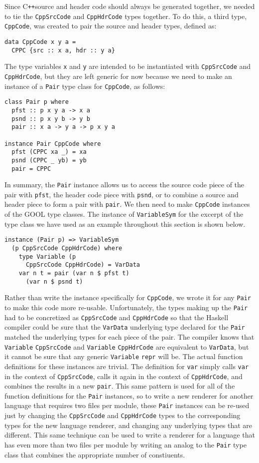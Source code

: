 \documentclass[sigplan,review,anonymous,prologue,dvipsnames]{acmart}
\newcommand{\Cplusplus}{C\texttt{++}}
\begin{document}
Since \Cplusplus source and header code should always be generated together, we needed
to tie the \verb|CppSrcCode| and \verb|CppHdrCode| types together. To do this,
a third type, \verb|CppCode|, was created to pair the source and header types,
defined as:
\begin{lstlisting}
data CppCode x y a =
  CPPC {src :: x a, hdr :: y a}
\end{lstlisting}
The type variables \verb|x| and \verb|y| are intended to be instantiated with
\verb|CppSrcCode| and \verb|CppHdrCode|, but they are left generic for now
because we need to make an instance of a \verb|Pair| type class for
\verb|CppCode|, as follows:
\begin{lstlisting}
class Pair p where
  pfst :: p x y a -> x a
  psnd :: p x y b -> y b
  pair :: x a -> y a -> p x y a

instance Pair CppCode where
  pfst (CPPC xa _) = xa
  psnd (CPPC _ yb) = yb
  pair = CPPC
\end{lstlisting}
In summary, the \verb|Pair| instance allows us to access the source code piece
of the pair with \verb|pfst|, the header code piece with \verb|psnd|, or to
combine a source and header piece to form a pair with \verb|pair|. We then need
to make \verb|CppCode| instances of the GOOL type classes. The instance of
\verb|VariableSym| for the excerpt of the type class we have used as an example
throughout this section is shown below.
\begin{lstlisting}
instance (Pair p) => VariableSym
  (p CppSrcCode CppHdrCode) where
    type Variable (p
      CppSrcCode CppHdrCode) = VarData
    var n t = pair (var n $ pfst t)
      (var n $ psnd t)
\end{lstlisting}
Rather than write the instance specifically for \verb|CppCode|, we wrote it for
any \verb|Pair| to make this code more re-usable. Unfortunately, the types
making up the \verb|Pair| had to be concretized as \verb|CppSrcCode| and
\verb|CppHdrCode| so that the Haskell compiler could be sure that the
\verb|VarData| underlying type declared for the \verb|Pair| matched the
underlying types for each piece of the pair. The compiler knows that
\verb|Variable| \verb|CppSrcCode| and \verb|Variable| \verb|CppHdrCode| are
equivalent to \verb|VarData|, but it cannot be sure that any generic
\verb|Variable| \verb|repr| will be. The actual function definitions for these
instances are trivial. The definition for \verb|var| simply calls \verb|var| in
the context of \verb|CppSrcCode|, calls it again in the context of
\verb|CppHdrCode|, and combines the results in a new \verb|pair|. This same
pattern is used for all of the function definitions for the \verb|Pair|
instances, so to write a new renderer for another language that requires two
files per module, these \verb|Pair| instances can be re-used just by changing
the \verb|CppSrcCode| and \verb|CppHdrCode| types to the corresponding types
for the new language renderer, and changing any underlying types that are
different. This same technique can be used to write a renderer for a language
that has even more than two files per module by writing an analog to the
\verb|Pair| type class that combines the appropriate number of constiuents.
\end{document}
